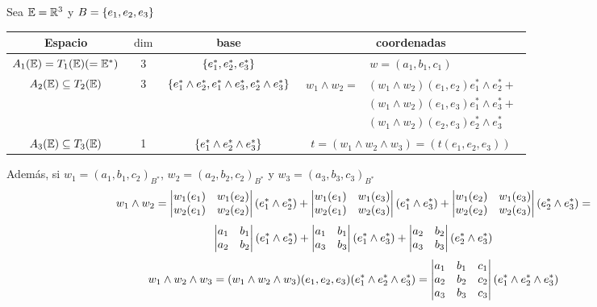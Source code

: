 \begin{example}
    Sea $\mathbb{E}=\mathbb{R}^3$ y $B = \left\{e_1,e_2,e_3\right\}$
    \begin{center}
        \begin{tabular}{|c|c|c|c|}
            \hline
            Espacio & $\dim$ & base & coordenadas \\
            \hline \hline
            $A_1(\mathbb{E})= T_1(\mathbb{E}) (=\mathbb{E}^*)$ & 3 & $\left\{e_1^*,e_2^*,e_3^*\right\}$ &
            $w = (a_1,b_1,c_1)$ \\ \hline $A_2(\mathbb{E}) \subseteq T_2(\mathbb{E})$ & 3 &
            $\left\{e_1^* \wedge e_2^*, e_1^* \wedge e_3^*, e_2^* \wedge e_3^*\right\}$ &
            $\begin{aligned}
                w_1 \wedge w_2 =& (w_1 \wedge w_2)(e_1,e_2) e_1^* \wedge e_2^* + \\
                 & (w_1 \wedge w_2)(e_1,e_3) e_1^* \wedge e_3^* + \\
                 & (w_1 \wedge w_2)(e_2,e_3) e_2^* \wedge e_3^*
            \end{aligned}$ \\
            \hline $A_3(\mathbb{E}) \subseteq T_3(\mathbb{E})$ & 1 &
            $\left\{e_1^* \wedge e_2^* \wedge e_3^*\right\}$ &
            $t =(w_1 \wedge w_2 \wedge w_3) = (t(e_1,e_2,e_3))$ \\ \hline
        \end{tabular}
    \end{center}
    Además, si $w_1=(a_1,b_1,c_2)_{B^*}$, $w_2=(a_2,b_2,c_2)_{B^*}$ y
    $w_3=(a_3,b_3,c_3)_{B^*}$
    \[
        w_1 \wedge w_2 = \begin{vmatrix}w_1(e_1) & w_1(e_2) \\ w_2(e_1) & w_2(e_2)\end{vmatrix}
        (e_1^* \wedge e_2^*) + \begin{vmatrix}w_1(e_1) & w_1(e_3) \\ w_2(e_1) & w_2(e_3)\end{vmatrix}
        (e_1^* \wedge e_3^*) + \begin{vmatrix}w_1(e_2) & w_1(e_3) \\ w_2(e_2) & w_2(e_3)\end{vmatrix}
        (e_2^* \wedge e_3^*) =
    \]
    \[
        \begin{vmatrix}a_1 & b_1 \\ a_2 & b_2\end{vmatrix}(e_1^* \wedge e_2^*) +
        \begin{vmatrix}a_1 & b_1 \\ a_3 & b_3\end{vmatrix}(e_1^* \wedge e_3^*)
        + \begin{vmatrix}a_2 & b_2 \\ a_3 & b_3\end{vmatrix}(e_2^* \wedge e_3^*)
    \]
    \[
        w_1 \wedge w_2 \wedge w_3 = (w_1 \wedge w_2 \wedge w_3)    (e_1,e_2,e_3)
        (e_1^* \wedge e_2^* \wedge e_3^*) =
        \begin{vmatrix}a_1 & b_1 & c_1 \\ a_2 & b_2 & c_2 \\ a_3 & b_3 & c_3\end{vmatrix}
        (e_1^* \wedge e_2^* \wedge e_3^*)
    \]
\end{example}


